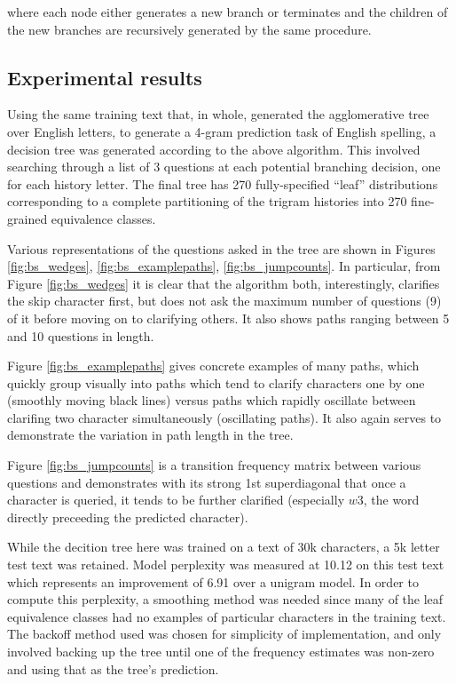 \documentclass[12pt]{article}
\begin{document}
where each node either generates a new branch or terminates and the
children of the new branches are recursively generated by the same
procedure.

\subsection{Experimental results}

Using the same training text that, in whole, generated the
agglomerative tree over English letters, to generate a 4-gram
prediction task of English spelling, a decision tree was generated
according to the above algorithm. This involved searching through a
list of 3 questions at each potential branching decision, one for each
history letter. The final tree has 270 fully-specified ``leaf''
distributions corresponding to a complete partitioning of the trigram
histories into 270 fine-grained equivalence classes.

Various representations of the questions asked in the tree are shown
in Figures \ref{fig:bs_wedges}, \ref{fig:bs_examplepaths},
\ref{fig:bs_jumpcounts}. In particular, from Figure
\ref{fig:bs_wedges} it is clear that the algorithm both,
interestingly, clarifies the skip character first, but does not ask
the maximum number of questions (9) of it before moving on to
clarifying others. It also shows paths ranging between 5 and 10
questions in length.

Figure \ref{fig:bs_examplepaths} gives concrete examples of many
paths, which quickly group visually into paths which tend to clarify
characters one by one (smoothly moving black lines) versus paths which
rapidly oscillate between clarifing two character simultaneously
(oscillating paths). It also again serves to demonstrate the variation
in path length in the tree.

Figure \ref{fig:bs_jumpcounts} is a transition frequency matrix
between various questions and demonstrates with its strong 1st
superdiagonal that once a character is queried, it tends to be further
clarified (especially $w3$, the word directly preceeding the predicted
character).

While the decition tree here was trained on a text of 30k characters,
a 5k letter test text was retained. Model perplexity was measured at
10.12 on this test text which represents an improvement of 6.91 over a
unigram model. In order to compute this perplexity, a smoothing method
was needed since many of the leaf equivalence classes had no examples
of particular characters in the training text. The backoff method used
was chosen for simplicity of implementation, and only involved backing
up the tree until one of the frequency estimates was non-zero and
using that as the tree's prediction.
\end{document}
